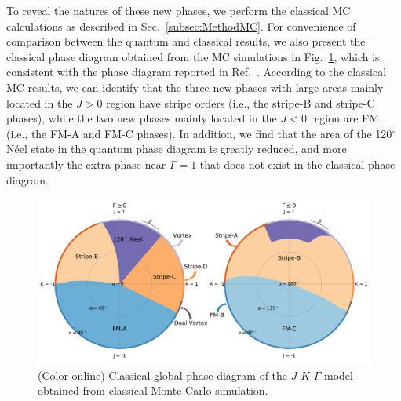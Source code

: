 \documentclass[aps,prb,reprint,amsfonts,amsmath,amssymb,showpacs,groupedaddress,superscriptaddress]{revtex4-1}
\begin{document}
To reveal the natures of these new phases, we perform the classical MC calculations as described in Sec.~\ref{subsec:MethodMC}. For convenience of comparison between the quantum and classical results, we also present the classical phase diagram obtained from the MC simulations in Fig.~\ref{fig:ClassicalPhaseDiagram}, which is consistent with the phase diagram reported in Ref.~. According to the classical MC results, we can identify that the three new phases with large areas mainly located in the $J>0$ region have stripe orders (i.e., the stripe-B and stripe-C phases), while the two new phases mainly located in the $J<0$ region are FM (i.e., the FM-A and FM-C phases). In addition, we find that the area of the 120$^\circ$ N\'{e}el state in the quantum phase diagram is greatly reduced, and more importantly the extra phase near $\Gamma=1$ that does not exist in the classical phase diagram.
\begin{figure}
    \centering
    \includegraphics[width=\columnwidth]{fig/ClassicalGlobalPhaseDiagram.pdf}
    \caption{\label{fig:ClassicalPhaseDiagram}(Color online) Classical global phase diagram of the $J$-$K$-$\Gamma$ model obtained from classical Monte Carlo simulation.}
\end{figure}
\end{document}
